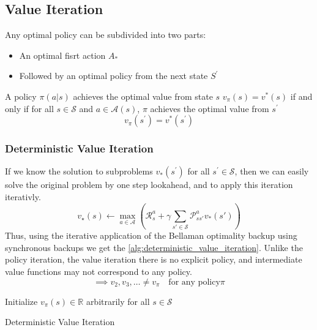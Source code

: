 \subsection{Value Iteration}
Any optimal policy can be subdivided into two parts:
\begin{itemize}
    \item An optimal fisrt action \(A_{*}\)
    \item Followed by an optimal policy from the next state \(S^{\prime} \)
\end{itemize}

\begin{theorem}
    A policy \(\pi(a|s)\) achieves the optimal value from state \(s\) \(v_{\pi}(s) = v^{*}(s)\)
    if and only if for all \(s \in \mathcal{S}\) and \(a \in \mathcal{A}(s)\), \(\pi \) 
    achieves the optimal value from \(s^{\prime}\)
    \[
        v_{\pi}(s^{\prime}) = v^{*}(s^{\prime})
    \]
\end{theorem}

\subsubsection{Deterministic Value Iteration}
If we know the solution to subproblems \(v_{*}(s^{\prime})\) for all \(s^{\prime} \in \mathcal{S}\),
then we can easily solve the original problem by one step lookahead, and to apply this iteration
iterativly.
\[
    v_{\star}(s) \gets \max_{a \in \mathcal{A}} \left(   
    \mathcal{R} _{s}^{a} + \gamma 
    \sum\limits_{s' \in \mathcal{S}} \mathcal{P}_{ss'}^{a} v_{*}(s') \right)
\]
Thus, using the iterative application of the Bellaman optimality backup using synchronous backups
we get the \autoref{alg:deterministic_value_iteration}.
Unlike the policy iteration, the value iteration there is no explicit policy, 
and intermediate value functions may not correspond to any policy.
\[
    \implies v_2, v_3, \dots  \neq v_\pi \quad \text{for any policy} \pi  
\]


\begin{algorithm}[H]
    \SetAlgoLined
    Initialize \(v_{\pi}(s) \in \mathbb{R}\) arbitrarily for all \(s \in \mathcal{S}\) \;
    \caption{Deterministic Value Iteration}
    \label{alg:deterministic_value_iteration}
\end{algorithm}

